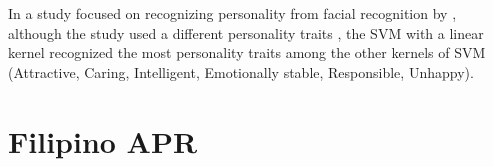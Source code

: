 In a study focused on recognizing personality from facial recognition by \citet{ilmini_persons_2016}, although the study used a different personality traits \citep{Kamenskaya_Kukharev_2008}, the SVM with a linear kernel recognized the most personality traits among the other kernels of SVM (Attractive, Caring, Intelligent, Emotionally stable, Responsible, Unhappy).

\begin{comment}
\begin{itemize}
    \item \citet{tighe_modeling_2018}
    \item \citet{mairesse_using_2007}
    \item \citet{ilmini_persons_2016}
    \item \citet{deilami_using_2022}
    \item \citet{farnadi_computational_2016}
    \item \citet{celli_automatic_2014}
    \item \citet{sarkar_feature_2014}
    \item \citet{salem_personality_2019}
    \item \citet{farnadi_computational_2016}
\end{itemize}
\end{comment}

\section{Filipino APR}
\label{sec: FilipinoAPR}




